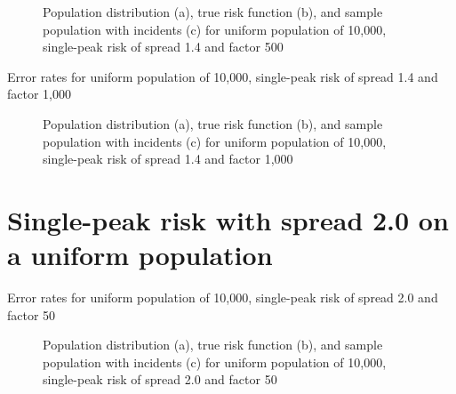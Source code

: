 {\begin{figure}[H]
    
    \caption[]{Population distribution (a), true risk function (b), and sample population with incidents (c) for uniform population of 10,000, single-peak risk of \gls{spread} 1.4 and \gls{factor} 500}
    \label{fig:distributions:unif_500_1.4_1h}    
\end{figure} \newpage



\begin{table}[H]

\caption[]{Error rates for uniform population of 10,000, single-peak risk of \gls{spread} 1.4 and \gls{factor} 1,000}
\label{tab:mean_error_rates:unif_1000_1.4_1h}
\end{table}

\begin{figure}[H]
    
    \caption[]{Population distribution (a), true risk function (b), and sample population with incidents (c) for uniform population of 10,000, single-peak risk of \gls{spread} 1.4 and \gls{factor} 1,000}
    \label{fig:distributions:unif_1000_1.4_1h}    
\end{figure} \newpage

 
 
\section{Single-peak risk with spread 2.0 on a uniform population}
\label{sec:app:results_unif_2.0_1h}


\begin{table}[H]
    
    \caption[]{Error rates for uniform population of 10,000, single-peak risk of \gls{spread} 2.0 and \gls{factor} 50}
    \label{tab:mean_error_rates:unif_50_2.0_1h}
\end{table}

\begin{figure}[H]
    
    \caption[]{Population distribution (a), true risk function (b), and sample population with incidents (c) for uniform population of 10,000, single-peak risk of \gls{spread} 2.0 and \gls{factor} 50}
    \label{fig:distributions:unif_50_2.0_1h}    
\end{figure} \newpage


}
